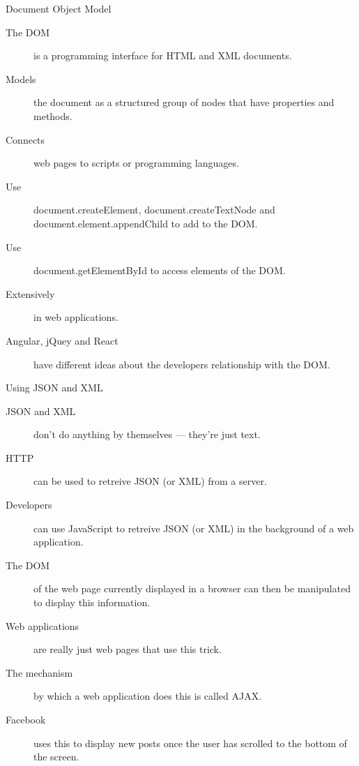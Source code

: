 \begin{frame}{Document Object Model}
  \begin{description}
    \item[The DOM] is a programming interface for HTML and XML documents.
    \item[Models] the document as a structured group of nodes that have properties and methods.
    \item[Connects] web pages to scripts or programming languages.
    \item[Use] document.createElement, document.createTextNode and document.element.appendChild to add to the DOM.
    \item[Use] document.getElementById to access elements of the DOM.
    \item[Extensively] in web applications.
    \item[Angular, jQuey and React] have different ideas about the developers relationship with the DOM.
  \end{description}
\end{frame}


\begin{frame}{Using JSON and XML}
  \begin{description}
    \item[JSON and XML] don't do anything by themselves --- they're just text.
    \item[HTTP] can be used to retreive JSON (or XML) from a server.
    \item[Developers] can use JavaScript to retreive JSON (or XML) in the background of a web application.
    \item[The DOM] of the web page currently displayed in a browser can then be manipulated to display this information.
    \item[Web applications] are really just web pages that use this trick.
    \item[The mechanism] by which a web application does this is called AJAX.
    \item[Facebook] uses this to display new posts once the user has scrolled to the bottom of the screen.
  \end{description}
\end{frame}


